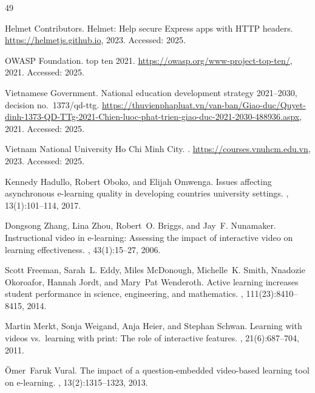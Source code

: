 \begin{thebibliography}{49}

{Helmet Contributors}.
\newblock Helmet: Help secure {Express} apps with {HTTP} headers.
\newblock \url{https://helmetjs.github.io}, 2023.
\newblock Accessed: 2025.

{OWASP Foundation}.
 top ten 2021.
\newblock \url{https://owasp.org/www-project-top-ten/}, 2021.
\newblock Accessed: 2025.

{Vietnamese Government}.
\newblock National education development strategy 2021--2030, decision no.\ 1373/qd-ttg.
\newblock \url{https://thuvienphapluat.vn/van-ban/Giao-duc/Quyet-dinh-1373-QD-TTg-2021-Chien-luoc-phat-trien-giao-duc-2021-2030-488936.aspx}, 2021.
\newblock Accessed: 2025.

{Vietnam National University Ho Chi Minh City}.
.
\newblock \url{https://courses.vnuhcm.edu.vn}, 2023.
\newblock Accessed: 2025.

Kennedy Hadullo, Robert Oboko, and Elijah Omwenga.
\newblock Issues affecting asynchronous e-learning quality in developing countries university settings.
, 13(1):101--114, 2017.

Dongsong Zhang, Lina Zhou, Robert~O. Briggs, and Jay~F. Nunamaker.
\newblock Instructional video in e-learning: Assessing the impact of interactive video on learning effectiveness.
, 43(1):15--27, 2006.

Scott Freeman, Sarah~L. Eddy, Miles McDonough, Michelle~K. Smith, Nnadozie Okoroafor, Hannah Jordt, and Mary~Pat Wenderoth.
\newblock Active learning increases student performance in science, engineering, and mathematics.
, 111(23):8410--8415, 2014.

Martin Merkt, Sonja Weigand, Anja Heier, and Stephan Schwan.
\newblock Learning with videos vs.\ learning with print: The role of interactive features.
, 21(6):687--704, 2011.

{\"O}mer~Faruk Vural.
\newblock The impact of a question-embedded video-based learning tool on e-learning.
, 13(2):1315--1323, 2013.


\end{thebibliography}
